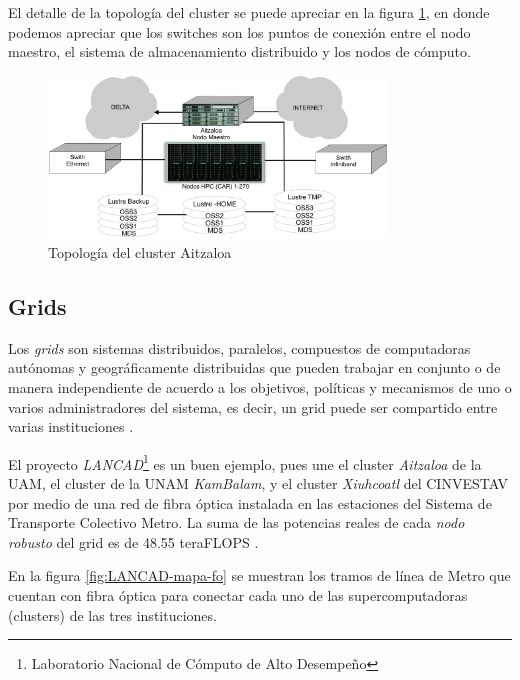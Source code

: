El detalle de la topología del cluster se puede apreciar en la figura \ref{fig:topologia_aitzaloa}, en donde podemos apreciar que los switches son los puntos de conexión entre el nodo maestro, el sistema de almacenamiento distribuido y los nodos de cómputo.

\begin{figure}
    \begin{center}
        \includegraphics[width=0.8\textwidth]{imagenes/topologia_aitzaloa}
    \end{center}
    \caption{Topología del cluster Aitzaloa}
    \label{fig:topologia_aitzaloa}
\end{figure}


\subsection{Grids}
Los \emph{grids} son sistemas distribuidos, paralelos, compuestos de computadoras autónomas y geográficamente distribuidas que pueden trabajar en conjunto o de manera independiente de acuerdo a los objetivos, políticas y mecanismos de uno o varios administradores del sistema, es decir, un grid puede ser compartido entre varias instituciones \cite{buyya2009cloud}. 

El proyecto \emph{LANCAD}\footnote{Laboratorio Nacional de Cómputo de Alto Desempeño} es un buen ejemplo, pues une el cluster \emph{Aitzaloa} de la UAM, el cluster de la UNAM \emph{KamBalam}, y el cluster \emph{Xiuhcoatl} del CINVESTAV por medio de una red de fibra óptica instalada en las estaciones del Sistema de Transporte Colectivo Metro. La suma de las potencias reales de cada \emph{nodo robusto} del grid es de 48.55 teraFLOPS \cite{lancad2013xiuhcoatl}.

En la figura \ref{fig:LANCAD-mapa-fo} se muestran los tramos de línea de Metro que cuentan con fibra óptica para conectar cada uno de las supercomputadoras (clusters) de las tres instituciones.

